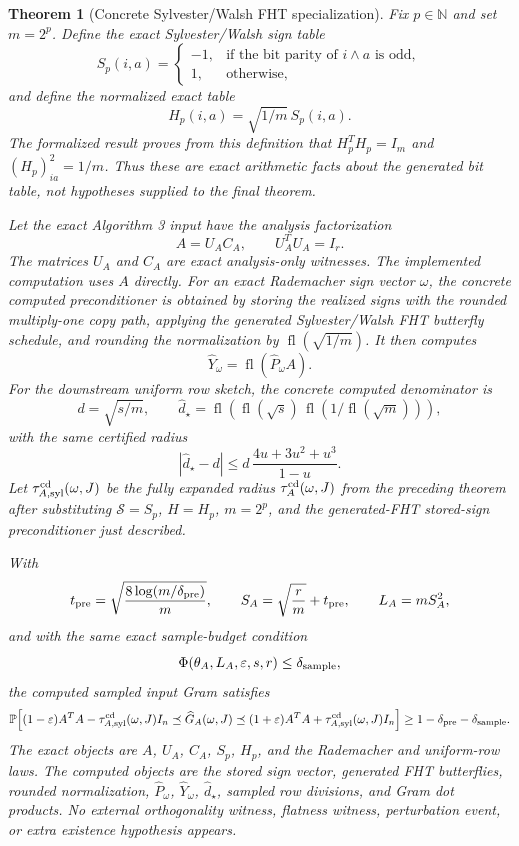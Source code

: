 \documentclass[11pt]{article}
\newcommand{\Prob}{\mathbb{P}}
\newcommand{\fl}{\operatorname{fl}}
\newcommand{\I}{I}
\newcommand{\eps}{\varepsilon}
\newtheorem{theorem}{Theorem}
\theoremstyle{remark}
\begin{document}
\begin{theorem}[Concrete Sylvester/Walsh FHT specialization]
Fix \(p\in\mathbb N\) and set \(m=2^p\).  Define the exact
Sylvester/Walsh sign table
\[
  S_p(i,a)=
  \begin{cases}
    -1, & \text{if the bit parity of }i\wedge a\text{ is odd},\\
     1, & \text{otherwise,}
  \end{cases}
\]
and define the normalized exact table
\[
  H_p(i,a)=\sqrt{1/m}\,S_p(i,a).
\]
The formalized result proves from this definition that \(H_p^TH_p=I_m\) and
\((H_p)_{ia}^2=1/m\).  Thus these are exact arithmetic facts about the
generated bit table, not hypotheses supplied to the final theorem.

Let the exact Algorithm 3 input have the analysis factorization
\[
  A=U_AC_A,\qquad U_A^TU_A=I_r .
\]
The matrices \(U_A\) and \(C_A\) are exact analysis-only witnesses.  The
implemented computation uses \(A\) directly.  For an exact Rademacher sign
vector \(\omega\), the concrete computed preconditioner is obtained by storing
the realized signs with the rounded multiply-one copy path, applying the
generated Sylvester/Walsh FHT butterfly schedule, and rounding the
normalization by \(\fl(\sqrt{1/m})\).  It then computes
\[
  \widehat Y_\omega=\fl(\widehat P_\omega A).
\]
For the downstream uniform row sketch, the concrete computed denominator is
\[
  d=\sqrt{s/m},\qquad
  \widehat d_\star
  =
  \fl\!\left(
    \fl(\sqrt{s})\,\fl(1/\fl(\sqrt m))
  \right),
\]
with the same certified radius
\[
  |\widehat d_\star-d|
  \le
  d\,\frac{4u+3u^2+u^3}{1-u}.
\]
Let \(\tau_{A,{\rm syl}}^{\rm cd}(\omega,J)\) be the fully expanded radius
\(\tau_A^{\rm cd}(\omega,J)\) from the preceding theorem after substituting
\(\mathcal S=S_p\), \(H=H_p\), \(m=2^p\), and the generated-FHT stored-sign
preconditioner just described.

With
\[
  t_{\rm pre}=\sqrt{\frac{8\log(m/\delta_{\rm pre})}{m}},
  \qquad
  S_A=\sqrt{\frac rm}+t_{\rm pre},
  \qquad
  L_A=mS_A^2,
\]
and with the same exact sample-budget condition
\[
  \Phi(\theta_A,L_A,\eps,s,r)\le\delta_{\rm sample},
\]
the computed sampled input Gram satisfies
\[
  \Prob\!\left[
    (1-\eps)A^TA-\tau_{A,{\rm syl}}^{\rm cd}(\omega,J)\I_n
    \preceq
    \widehat G_A(\omega,J)
    \preceq
    (1+\eps)A^TA+\tau_{A,{\rm syl}}^{\rm cd}(\omega,J)\I_n
  \right]
  \ge
  1-\delta_{\rm pre}-\delta_{\rm sample}.
\]
The exact objects are \(A\), \(U_A\), \(C_A\), \(S_p\), \(H_p\), and the
Rademacher and uniform-row laws.  The computed objects are the stored sign
vector, generated FHT butterflies, rounded normalization, \(\widehat P_\omega\),
\(\widehat Y_\omega\), \(\widehat d_\star\), sampled row divisions, and Gram
dot products.  No external orthogonality witness, flatness witness,
perturbation event, or extra existence hypothesis appears.
\end{theorem}
\end{document}
